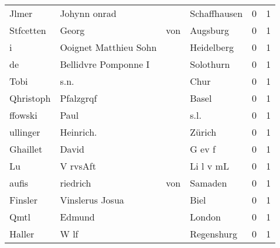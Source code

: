 \documentclass[10pt,a4paper,landscape]{article}
\begin{document}
\begin{longtable}{llllrr}
                    Jlmer &                       Johynn onrad &             &                                Schaffhausen &          0 &         1 \\
                Stfcetten &                              Georg &         von &                                    Augsburg &          0 &         1 \\
                        i &              Ooignet Matthieu Sohn &             &                                  Heidelberg &          0 &         1 \\
                       de &               Bellidvre Pomponne I &             &                                   Solothurn &          0 &         1 \\
                     Tobi &                               s.n. &             &                                        Chur &          0 &         1 \\
                Qhristoph &                          Pfalzgrqf &             &                                       Basel &          0 &         1 \\
                  ffowski &                               Paul &             &                                        s.l. &          0 &         1 \\
                 ullinger &                          Heinrich. &             &                                      Zürich &          0 &         1 \\
                 Ghaillet &                              David &             &                                      G ev f &          0 &         1 \\
                       Lu &                           V rvsAft &             &                                   Li l v mL &          0 &         1 \\
                    aufis &                           riedrich &         von &                                     Samaden &          0 &         1 \\
                  Finsler &                    Vinslerus Josua &             &                                        Biel &          0 &         1 \\
                     Qmtl &                             Edmund &             &                                      London &          0 &         1 \\
                   Haller &                               W lf &             &                                  Regenshurg &          0 &         1 \\

\end{longtable}
\end{document}
